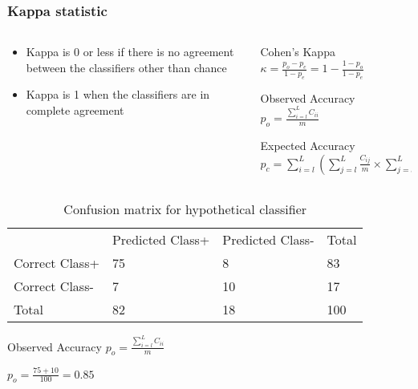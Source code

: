 \begin{frame}
	\frametitle{Kappa statistic}
	\begin{columns}
		\begin{column}{0.5\textwidth}
			\begin{itemize}
				\item Kappa is 0 or less if there is no agreement between the classifiers other than chance
				\item Kappa is 1 when the classifiers are in complete agreement
			\end{itemize}
		\end{column}
		\begin{column}{0.5\textwidth}  %
			\begin{block}{Cohen's Kappa}
				\centering
				$\kappa = \frac{p_o-p_e}{1-p_e} = 1-\frac{1-p_o}{1-p_e}$
			\end{block}
			\begin{block}{Observed Accuracy}
				\centering
				$p_o = \frac{\sum_{i=l}^{L}C_{ii}}{m}$
			\end{block}
			\begin{block}{Expected Accuracy}
				\centering
				$p_c=\sum_{i=l}^{L}(\sum_{j=l}^{L}\frac{C_{ij}}{m}\times\sum_{j=l}^{L}\frac{C_{ji}}{m})$
			\end{block}
		\end{column}
	\end{columns}
\end{frame}

\begin{frame}
	\begin{table}[htb]
		\centering
		\begin{tabular}{llll}
			\multicolumn{1}{c}{} & Predicted Class+ & Predicted Class- & Total \\ \cmidrule{2-4}
			Correct Class+	& \num{75}	& \num{8}	& 83\\
			Correct Class-	& \num{7}	& \num{10}	& 17\\ \cmidrule{1-4}
			Total			& 82		& 18		& 100
		\end{tabular}
		\caption{Confusion matrix for hypothetical classifier}
	\end{table}
	\begin{block}{Observed Accuracy}
		\centering
		$p_o = \frac{\sum_{i=l}^{L}C_{ii}}{m}$
	\end{block}
	\begin{block}{}
		\centering
		$p_o = \frac{75+10}{100} = 0.85$
	\end{block}
	\note{}
\end{frame}

